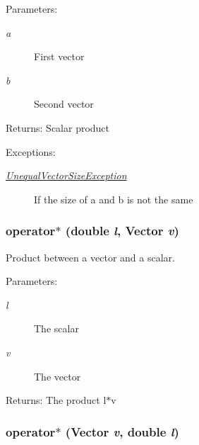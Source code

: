 \begin{Desc}
\item[Parameters:]
\begin{description}
\item[{\em a}]First vector \item[{\em b}]Second vector \end{description}
\end{Desc}
\begin{Desc}
\item[Returns:]Scalar product \end{Desc}
\begin{Desc}
\item[Exceptions:]
\begin{description}
\item[{\em \hyperlink{classgrassmann_1_1UnequalVectorSizeException}{UnequalVectorSizeException}}]If the size of a and b is not the same \end{description}
\end{Desc}
\hypertarget{classgrassmann_1_1Vector_e5f388dfbc55ca5afce80591fbfdcd67}{
\subsubsection[operator$\ast$]{ operator$\ast$ (double {\em l}, \/  {\bf Vector} {\em v})}}
\label{classgrassmann_1_1Vector_e5f388dfbc55ca5afce80591fbfdcd67}


Product between a vector and a scalar. 

\begin{Desc}
\item[Parameters:]
\begin{description}
\item[{\em l}]The scalar \item[{\em v}]The vector \end{description}
\end{Desc}
\begin{Desc}
\item[Returns:]The product l$\ast$v \end{Desc}
\hypertarget{classgrassmann_1_1Vector_0b7d545365b106c4a84d6970964ab56c}{
\subsubsection[operator$\ast$]{ operator$\ast$ ({\bf Vector} {\em v}, \/  double {\em l})}}
\label{classgrassmann_1_1Vector_0b7d545365b106c4a84d6970964ab56c}


